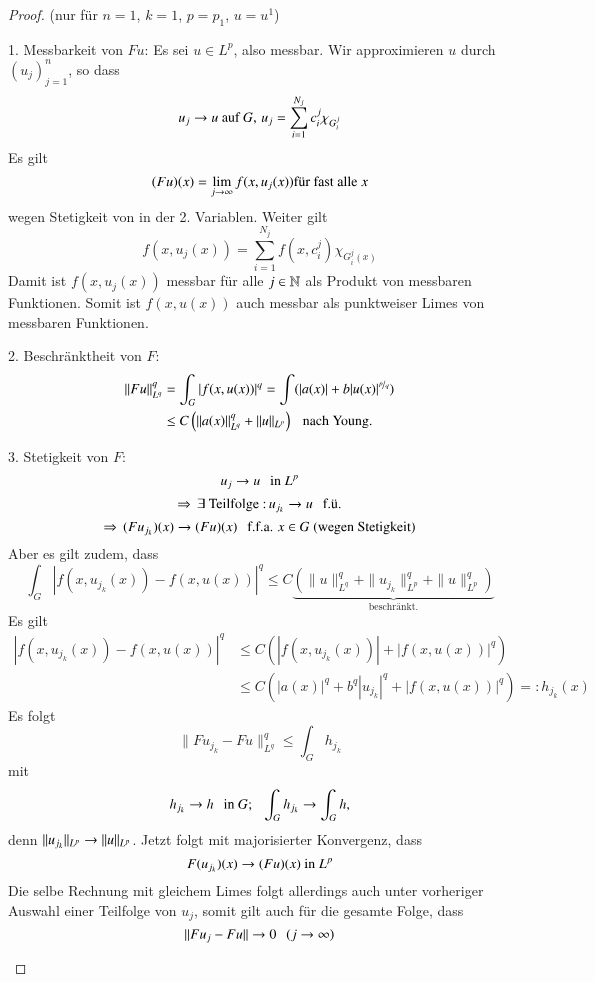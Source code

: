 \begin{proof}
    (nur für $n=1$, $k=1$, $p=p_1$, $u=u^1$)
    \begin{description}
    \item{1. Messbarkeit von $Fu$:}
    Es sei $u\in L^p$, also messbar. Wir approximieren $u$ durch
    $(u_j)_{j=1}^n$, so dass
    \[
        u_j\rightarrow u \text{ auf } G, \, u_j=\sum_{i=1}^{N_j} c_i^j \chi_{G_i^j}
    \]
    Es gilt
    \[
        (Fu)(x)= \lim_{j\rightarrow \infty} f(x,u_j(x)) \text{für fast alle } x
    \]
    wegen Stetigkeit von in der 2. Variablen. Weiter gilt
    \[
        f(x,u_j(x))=\sum_{i=1}^{N_j} f(x,c_i^j) \chi_{G_i^j(x)}
    \]
    Damit ist $f(x,u_j(x))$ messbar für alle $j\in \mathbb{N}$ als Produkt von messbaren Funktionen.
    Somit ist $f(x,u(x))$ auch messbar als punktweiser Limes von messbaren Funktionen.

    \item{2. Beschränktheit von $F$:}
    \begin{align*}
        \|Fu\|_{L^q}^q &= \int_G|f(x,u(x))|^q= \int(|a(x)| + b |u(x)|^{\nicefrac pq})\\
            &\leq C\left( \|a(x)\|_{L^q}^q+\|u\|_{L^p} \right) \hspace{.25cm} \text{nach Young}.
    \end{align*}
    \item{3. Stetigkeit von $F$:}
    \[u_j\rightarrow u \hspace{.25cm} \text{in } L^p\]
    \[
        \Rightarrow \, \exists \text{ Teilfolge :} \, u_{j_k}\rightarrow u \hspace{.25cm} \text{f.ü.}
    \]
    \[
        \Rightarrow \, (Fu_{j_k})(x) \rightarrow (Fu)(x) \hspace{.25cm} \text{f.f.a. } x\in G \text{ (wegen Stetigkeit)}
    \]
    Aber es gilt zudem, dass
    \[
        \int_G|f(x,u_{j_k}(x)) - f(x,u(x))|^q 
        \leq C \underbrace{(\|u\|^q_{L^q} + \|u_{j_k}\|_{L^p}^q+\|u\|_{L^p}^q)}_{\text{beschränkt.}}
    \]
    Es gilt
    \begin{align*}
        |f(x,u_{j_k}(x)) - f(x,u(x))|^q &\leq C(|f(x,u_{j_k}(x))|+ |f(x,u(x))|^q)\\
        &\leq C(|a(x)|^q + b^q|u_{j_k}|^q + |f(x,u(x))|^q) =: h_{j_k}(x)
    \end{align*}
    Es folgt
    \[
        \|Fu_{j_k}-Fu\|_{L^q}^q\leq \int_G h_{j_k}
    \]
    mit
    \[
        h_{j_k}\rightarrow h \hspace{.25cm} \text{in } G; \hspace{.25cm} \int_{G}h_{j_k} \rightarrow \int_G h,
    \]
    denn $\|u_{j_k}\|_{L^p}\rightarrow \|u\|_{L^p}$. Jetzt folgt mit majorisierter Konvergenz, dass
    \[
        F(u_{j_k})(x)\rightarrow (Fu)(x) \text{ in } L^p
    \]
    Die selbe Rechnung mit gleichem Limes folgt allerdings auch unter vorheriger
    Auswahl einer Teilfolge von $u_j$, somit gilt auch für die gesamte Folge, dass
    \[
        \|Fu_j-Fu\|\rightarrow 0 \hspace{.25cm} (j\rightarrow \infty)
    \]
    \end{description}\[ \]
\end{proof}

